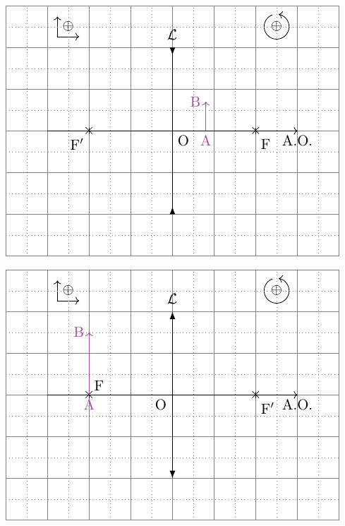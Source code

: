 \documentclass[../../main/main.tex]{subfiles}
\begin{document}
\begin{tcb*}[label=impo:cons_exem]
\begin{minipage}{0.50\linewidth}
\begin{center}
			\label{fig:convconstruafter}
		\end{center}
	\end{minipage}
	\begin{minipage}{0.50\linewidth}
		\begin{center}
			\includegraphics[width=\linewidth]{lent_div-constru_after_a-plain}
			\label{fig:divconstruafter}
		\end{center}
	\end{minipage}
	\hfill
	\begin{minipage}{0.50\linewidth}
		\begin{center}
			\includegraphics[width=\linewidth]{lent_conv-constru_F-plain}
			\label{fig:convconstruF}
		\end{center}
	\end{minipage}
\end{tcb*}
\end{document}
